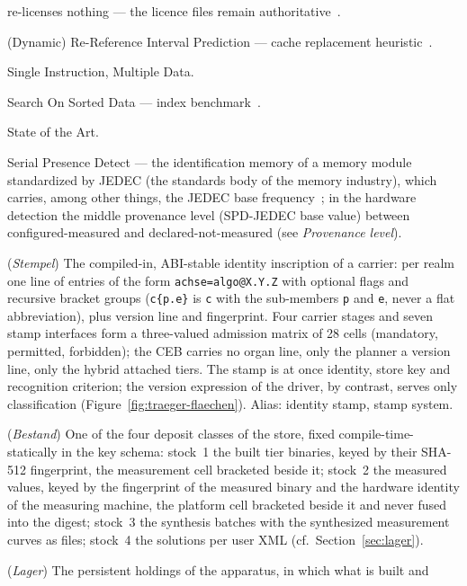 \begin{description}
  re-licenses nothing --- the licence files remain authoritative~\cite{fsfe2024reuse}.
  \item[RRIP, DRRIP] (Dynamic) Re-Reference Interval Prediction --- cache replacement
  heuristic~\cite{jaleel2010rrip}.
  \item[SIMD] Single Instruction, Multiple Data.
  \item[SOSD] Search On Sorted Data --- index benchmark~\cite{kipf2019sosd}.
  \item[SOTA] State of the Art.
  \item[SPD, JEDEC] Serial Presence Detect --- the identification memory of a memory module
  standardized by JEDEC (the standards body of the memory industry), which carries, among other
  things, the JEDEC base frequency~\cite{jedec_jesd400_5}; in the hardware detection the middle
  provenance level (SPD-JEDEC base value) between configured-measured and declared-not-measured
  (see \emph{Provenance level}).
  \item[Stamp] (\emph{Stempel}) The compiled-in, ABI-stable identity inscription of a carrier: per
  realm one line of entries of the form \texttt{achse=algo@X.Y.Z} with optional flags and
  recursive bracket groups (\texttt{c\{p.e\}} is \texttt{c} with the sub-members \texttt{p} and
  \texttt{e}, never a flat abbreviation), plus version line and fingerprint. Four carrier stages
  and seven stamp interfaces form a three-valued admission matrix of 28 cells (mandatory,
  permitted, forbidden); the CEB carries no organ line, only the planner a version line, only the
  hybrid attached tiers. The stamp is at once identity, store key and recognition criterion; the
  version expression of the driver, by contrast, serves only classification
  (Figure~\ref{fig:traeger-flaechen}). Alias: identity stamp, stamp system.
  \item[Stock] (\emph{Bestand}) One of the four deposit classes of the store, fixed
  compile-time-statically in the key schema: stock~1 the built tier binaries, keyed by their
  SHA-512 fingerprint, the measurement cell bracketed beside it; stock~2 the measured values, keyed
  by the fingerprint of the measured binary and the hardware identity of the measuring machine, the
  platform cell bracketed beside it and never fused into the digest; stock~3 the synthesis batches
  with the synthesized measurement curves as files; stock~4 the solutions per user XML
  (cf.\ Section~\ref{sec:lager}).
  \item[Store] (\emph{Lager}) The persistent holdings of the apparatus, in which what is built and

\end{description}
